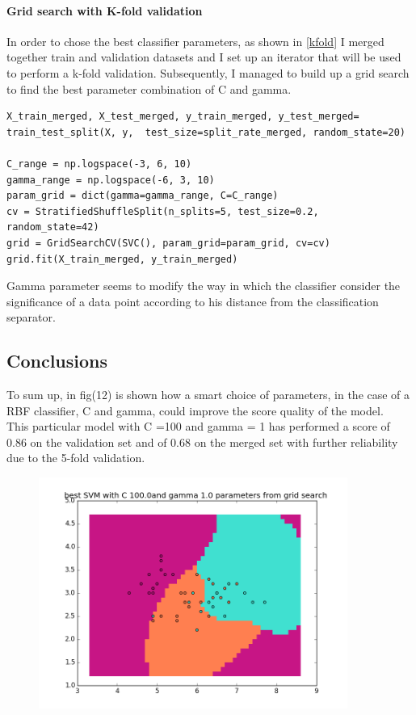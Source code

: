 \documentclass{article}
\begin{document}
\newpage

\subsection{Grid search with K-fold validation}
In order to chose the best classifier parameters, as shown in \ref{kfold} I merged together train and validation datasets and I set up an iterator that will be used to perform a k-fold validation.
 Subsequently, I managed to build up a grid search to find the best parameter combination of C and gamma.
 							\begin{lstlisting}[caption= Kfold wihin a grid search, label=kfold]
X_train_merged, X_test_merged, y_train_merged, y_test_merged= train_test_split(X, y,  test_size=split_rate_merged, random_state=20)

C_range = np.logspace(-3, 6, 10)
gamma_range = np.logspace(-6, 3, 10)
param_grid = dict(gamma=gamma_range, C=C_range)
cv = StratifiedShuffleSplit(n_splits=5, test_size=0.2, random_state=42)
grid = GridSearchCV(SVC(), param_grid=param_grid, cv=cv)
grid.fit(X_train_merged, y_train_merged)
\end{lstlisting}


 Gamma parameter seems to modify the way in which the classifier consider the significance of a data point according to his distance from the classification separator.
				
								\begin{center}

	
\newpage
			\part{Conclusions}
				
To sum up, in fig(12) is shown how a smart choice of parameters, in the case of a RBF classifier, C and gamma, could improve the score quality of the model.\medskip\\
This particular model with C =100 and gamma = 1 has performed a score of 0.86 on the validation set and of 0.68 on the merged set with further reliability due to the 5-fold validation.
\begin{figure}
\centering
\includegraphics[width=0.9\textwidth]{figure_19}
\caption{}
\label{fig:12}
\end{figure}
\end{center}
			
		
\end{document}
